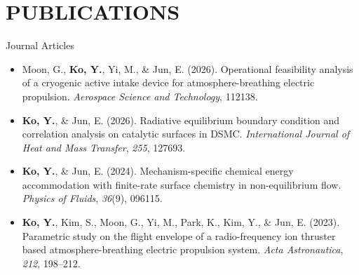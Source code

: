 \section{PUBLICATIONS}
    \resumeSubHeadingListStart
    
    \vspace{10pt}        
    
        \resumePublicationheading
        {Journal Articles}{}
        
        \begin{itemize}[leftmargin=0.45in, label={}]

            \item [{[J4]}] Moon, G., \textbf{Ko, Y.}, Yi, M., \& Jun, E. (2026). Operational feasibility analysis of a cryogenic active intake device for atmosphere-breathing electric propulsion. \textit{Aerospace Science and Technology}, 112138.

            \item [{[J3]}] \textbf{Ko, Y.}, \& Jun, E. (2026). Radiative equilibrium boundary condition and correlation analysis on catalytic surfaces in DSMC. \textit{International Journal of Heat and Mass Transfer}, \textit{255}, 127693.

            \item [{[J2]}] \textbf{Ko, Y.}, \& Jun, E. (2024). Mechanism-specific chemical energy accommodation with finite-rate surface chemistry in non-equilibrium flow. \textit{Physics of Fluids}, \textit{36}(9), 096115.

            \item [{[J1]}] \textbf{Ko, Y.}, Kim, S., Moon, G., Yi, M., Park, K., Kim, Y., \& Jun, E. (2023). Parametric study on the flight envelope of a radio-frequency ion thruster based atmosphere-breathing electric propulsion system. \textit{Acta Astronautica}, \textit{212}, 198--212.
        \end{itemize}

